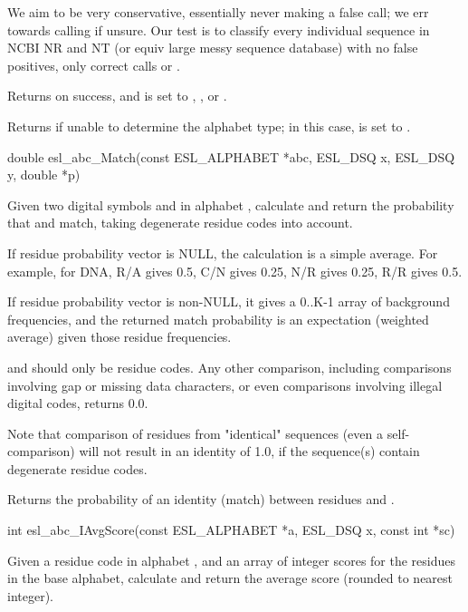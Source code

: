 \begin{sreapi}
We aim to be very conservative, essentially never making
a false call; we err towards calling  if
unsure. Our test is to classify every individual
sequence in NCBI NR and NT (or equiv large messy
sequence database) with no false positives, only correct
calls or .

Returns  on success, and  is set to
, , or .

Returns  if unable to determine the
alphabet type; in this case,  is set to 
.



\hypertarget{func:esl_abc_Match()}
{\item[double esl\_abc\_Match(const ESL\_ALPHABET *abc, ESL\_DSQ x, ESL\_DSQ y, double *p)]}

Given two digital symbols  and  in alphabet
, calculate and return the probability that
 and  match, taking degenerate residue codes
into account.

If  residue probability vector is NULL, the
calculation is a simple average. For example, for DNA,
R/A gives 0.5, C/N gives 0.25, N/R gives 0.25, R/R gives
0.5.

If  residue probability vector is non-NULL, it gives
a 0..K-1 array of background frequencies, and the
returned match probability is an expectation (weighted
average) given those residue frequencies.

 and  should only be residue codes. Any other
comparison, including comparisons involving gap or
missing data characters, or even comparisons involving
illegal digital codes, returns 0.0.

Note that comparison of residues from "identical"
sequences (even a self-comparison) will not result in an
identity of 1.0, if the sequence(s) contain degenerate
residue codes.

Returns the probability of an identity (match) between
residues  and .


\hypertarget{func:esl_abc_IAvgScore()}
{\item[int esl\_abc\_IAvgScore(const ESL\_ALPHABET *a, ESL\_DSQ x, const int *sc)]}

Given a residue code  in alphabet , and an array of
integer scores  for the residues in the base
alphabet, calculate and return the average score
(rounded to nearest integer).


\end{sreapi}
